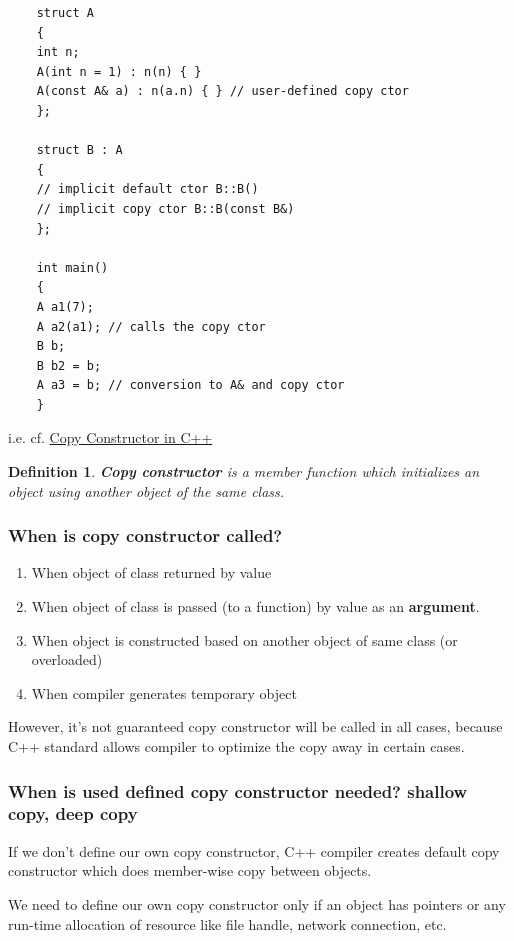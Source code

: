 \documentclass[10pt]{amsart}
\newtheorem{definition}{Definition}
\begin{document}
	\begin{lstlisting}
	struct A
	{
	int n;
	A(int n = 1) : n(n) { }
	A(const A& a) : n(a.n) { } // user-defined copy ctor
	};
	
	struct B : A
	{
	// implicit default ctor B::B()
	// implicit copy ctor B::B(const B&)
	};
	
	int main()
	{
	A a1(7);
	A a2(a1); // calls the copy ctor
	B b;
	B b2 = b;
	A a3 = b; // conversion to A& and copy ctor  
	}
	\end{lstlisting}  

i.e. cf. \href{http://www.geeksforgeeks.org/copy-constructor-in-cpp/}{Copy Constructor in C++}

\begin{definition}
	\textbf{Copy constructor} is a member function which initializes an object using another object of the same class.  
\end{definition}

\subsubsection{When is copy constructor called? } 
\begin{enumerate}
	\item When object of class returned by value 
	\item When object of class is passed (to a function) by value as an \textbf{argument}.  
	\item When object is constructed based on another object of same class  (or overloaded)  
	\item When compiler generates temporary object  
\end{enumerate}


However, it's not guaranteed copy constructor will be called in all cases, because C++ standard allows compiler to optimize the copy away in certain cases.  

\subsubsection{When is used defined copy constructor needed?  shallow copy, deep copy}  

If we don't define our own copy constructor, C++ compiler creates default copy constructor which does member-wise copy between objects.  

We need to define our own copy constructor only if an object has pointers or any run-time allocation of resource like file handle, network connection, etc.  
\end{document}
